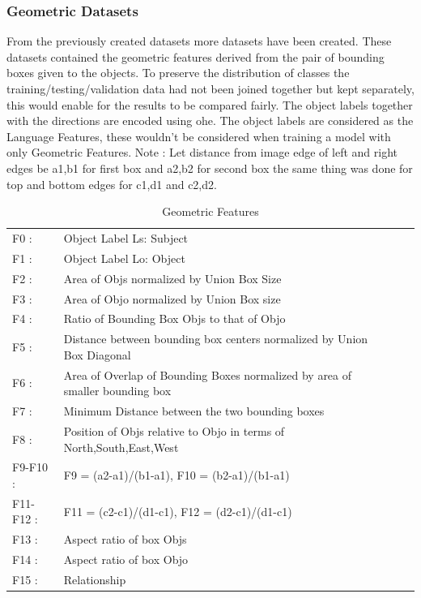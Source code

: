 \documentclass{csfyp}
\begin{document}
\subsubsection{Geometric Datasets}
From the previously created datasets more datasets have been created. These datasets contained the geometric features derived from the pair of bounding boxes given to the objects. To preserve the distribution of classes the training/testing/validation data had not been joined together but kept separately, this would enable for the results to be compared fairly. The object labels together with the directions are encoded using \Gls{ohe}. The object labels are considered as the Language Features, these wouldn't be considered when training a model with only Geometric Features.
Note : Let distance from image edge of left and right edges be a1,b1 for first box and a2,b2 for second box the same thing was done for top and bottom edges for c1,d1 and c2,d2.

\begin{table}[!htbp]
\centering
\begin{tabular}{|l|l|lll}
\cline{1-2}
F0 : & Object Label Ls: Subject \\ \cline{1-2}
F1 : & Object Label Lo: Object  \\ \cline{1-2}
F2 : & Area of Objs normalized by Union Box Size \\ \cline{1-2}
F3 : & Area of Objo normalized by Union Box size \\ \cline{1-2}
F4 : &  Ratio of Bounding Box Objs to that of Objo  \\ \cline{1-2}
F5 : &  Distance between bounding box centers normalized by Union Box Diagonal \\ \cline{1-2}
F6 : & Area of Overlap of Bounding Boxes normalized by area of smaller bounding box \\ \cline{1-2}
F7 : & Minimum Distance between the two bounding boxes \\ \cline{1-2}
F8 : & Position of Objs relative to Objo in terms of North,South,East,West \\ \cline{1-2}
F9-F10 : & F9 = (a2-a1)/(b1-a1), F10 = (b2-a1)/(b1-a1) \\ \cline{1-2}
F11-F12 : & F11 = (c2-c1)/(d1-c1), F12 = (d2-c1)/(d1-c1) \\ \cline{1-2}
F13 : & Aspect ratio of box Objs \\ \cline{1-2}
F14 : & Aspect ratio of box Objo \\ \cline{1-2}
F15 : & Relationship \\ \cline{1-2}
\end{tabular}
\caption{Geometric Features}
\end{table}
\end{document}
